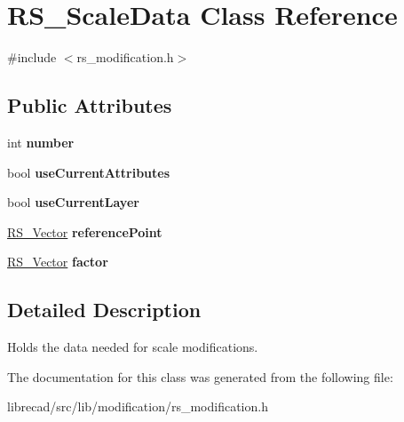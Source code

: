 \hypertarget{classRS__ScaleData}{\section{R\-S\-\_\-\-Scale\-Data Class Reference}
\label{classRS__ScaleData}
}


{\ttfamily \#include $<$rs\-\_\-modification.\-h$>$}

\subsection*{Public Attributes}
\begin{DoxyCompactItemize}
\item 
\hypertarget{classRS__ScaleData_a7ae50df99c42af82272c6b93ffb50dad}{int {\bfseries number}}\label{classRS__ScaleData_a7ae50df99c42af82272c6b93ffb50dad}

\item 
\hypertarget{classRS__ScaleData_a1a64fc580cf9064384b5c17ce25c1e11}{bool {\bfseries use\-Current\-Attributes}}\label{classRS__ScaleData_a1a64fc580cf9064384b5c17ce25c1e11}

\item 
\hypertarget{classRS__ScaleData_a1c9ea129c170af87e3d6a2777af0d63e}{bool {\bfseries use\-Current\-Layer}}\label{classRS__ScaleData_a1c9ea129c170af87e3d6a2777af0d63e}

\item 
\hypertarget{classRS__ScaleData_a3d8b4cffdd21b854b0be7cf438723762}{\hyperlink{classRS__Vector}{R\-S\-\_\-\-Vector} {\bfseries reference\-Point}}\label{classRS__ScaleData_a3d8b4cffdd21b854b0be7cf438723762}

\item 
\hypertarget{classRS__ScaleData_a16efa0708f81ba8ff3c37a1b0566eba8}{\hyperlink{classRS__Vector}{R\-S\-\_\-\-Vector} {\bfseries factor}}\label{classRS__ScaleData_a16efa0708f81ba8ff3c37a1b0566eba8}

\end{DoxyCompactItemize}


\subsection{Detailed Description}
Holds the data needed for scale modifications. 

The documentation for this class was generated from the following file\-:\begin{DoxyCompactItemize}
\item 
librecad/src/lib/modification/rs\-\_\-modification.\-h\end{DoxyCompactItemize}
